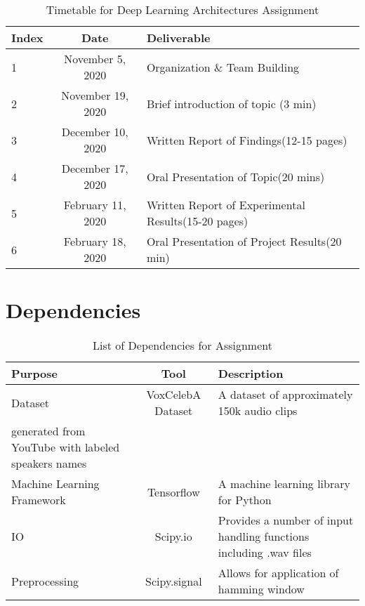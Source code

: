 \documentclass[12pt]{article}
\begin{document}
\begin{table}[h!]
	\begin{center}
		\caption{Timetable for Deep Learning Architectures Assignment}
		\label{tab:table1}
		\begin{tabular}{l|c|l}
			\textbf{Index} & \textbf{Date} & \textbf{Deliverable} \\
			\hline
			1 & November 5, 2020 & Organization \& Team Building\\
			2 & November 19, 2020 & Brief introduction of topic (3 min)\\
			3 & December 10, 2020 & Written Report of Findings(12-15 pages)\\
			4 & December 17, 2020 & Oral Presentation of Topic(20 mins)\\
			5 & February 11, 2020 & Written Report of Experimental Results(15-20 pages)\\
			6 & February 18, 2020 & Oral Presentation of Project Results(20 min)\\
			\end{tabular}
		\end{center}
	\end{table}

\section{Dependencies}

\begin{table}[h!]
	\begin{center}
		\caption{List of Dependencies for Assignment}
		\label{tab:table1}
		\begin{tabular}{l|c|l}
			\textbf{Purpose} & \textbf{Tool} & \textbf{Description} \\
			\hline
			Dataset & VoxCelebA Dataset & A dataset of approximately 150k audio clips\\ generated from YouTube with labeled speakers names\\
			Machine Learning Framework &  Tensorflow & A machine learning library for Python\\
			IO & Scipy.io & Provides a number of input handling functions including .wav files \\
			Preprocessing & Scipy.signal & Allows for application of hamming window\\
			\end{tabular}
		\end{center}
	\end{table}
\end{document}
